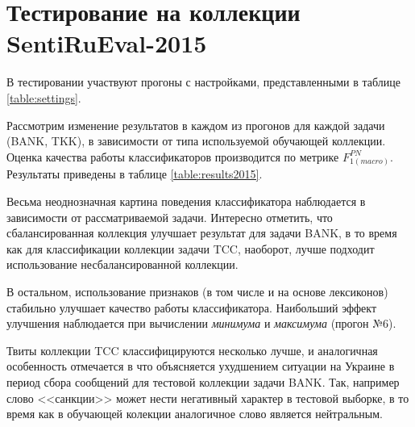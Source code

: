 \section{Тестирование на коллекции SentiRuEval-2015}

В тестировании участвуют прогоны с настройками, представленными в таблице
\ref{table:settings}.



Рассмотрим изменение результатов в каждом из прогонов для каждой задачи
(BANK, TKK), в зависимости от типа используемой обучающей коллекции.
Оценка качества работы классификаторов производится по метрике
$F_{1(macro)}^{PN}$.
Результаты приведены в таблице
\ref{table:results2015}.



Весьма неоднозначная картина поведения классификатора наблюдается в зависимости
от рассматриваемой задачи.
Интересно отметить, что сбалансированная коллекция улучшает результат для
задачи BANK, в то время как для классификации коллекции задачи TCC, наоборот,
лучше подходит использование несбалансированной коллекции.

В остальном, использование признаков (в том числе и на основе лексиконов)
стабильно улучшает качество работы классификатора.
Наибольший эффект улучшения наблюдается при вычислении
{\it минимума } и {\it максимума} (прогон №6).

Твиты коллекции TCC классифицируются несколько лучше, и аналогичная особенность
отмечается в \cite{tonalityAnalysis} что объясняется ухудшением ситуации на
Украине в период сбора сообщений для тестовой коллекции задачи BANK.
Так, например слово <<санкции>> может нести негативный характер в тестовой
выборке, в то время как в обучающей колекции аналогичное слово является
нейтральным.


